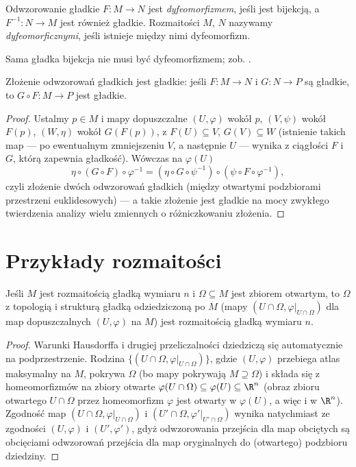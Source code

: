 \begin{definicja}\label{def dyfeo}
Odwzorowanie gładkie $F\colon M\to N$ jest \emph{dyfeomorfizmem}, jeśli jest bijekcją, a
$F^{-1}\colon N\to M$ jest również gładkie. Rozmaitości $M$, $N$ nazywamy
\emph{dyfeomorficznymi}, jeśli istnieje między nimi dyfeomorfizm.
\end{definicja}

Sama gładka bijekcja nie musi być dyfeomorfizmem; zob. .

\begin{stwierdzenie}
Złożenie odwzorowań gładkich jest gładkie: jeśli $F\colon M\to N$ i $G\colon N\to P$ są
gładkie, to $G\circ F\colon M\to P$ jest gładkie.
\end{stwierdzenie}

\begin{proof}
Ustalmy $p\in M$ i mapy dopuszczalne $(U,\varphi)$ wokół $p$, $(V,\psi)$ wokół $F(p)$,
$(W,\eta)$ wokół $G(F(p))$, z $F(U)\subseteq V$, $G(V)\subseteq W$ (istnienie takich map —
po ewentualnym zmniejszeniu $V$, a następnie $U$ — wynika z ciągłości $F$ i $G$, którą zapewnia gładkość).
Wówczas na $\varphi(U)$
\[
\eta\circ(G\circ F)\circ\varphi^{-1}=(\eta\circ G\circ\psi^{-1})\circ(\psi\circ F\circ
\varphi^{-1}),
\]
czyli złożenie dwóch odwzorowań gładkich (między otwartymi podzbiorami przestrzeni
euklidesowych) — a takie złożenie jest gładkie na mocy zwykłego twierdzenia analizy wielu
zmiennych o różniczkowaniu złożenia.
\end{proof}
\section{Przykłady rozmaitości}

\begin{stwierdzenie}\label{stw:otwarty-podzbior}
Jeśli $M$ jest rozmaitością gładką wymiaru $n$ i $\Omega\subseteq M$ jest zbiorem otwartym,
to $\Omega$ z topologią i strukturą gładką odziedziczoną po $M$ (mapy $(U\cap\Omega,
\varphi|_{U\cap\Omega})$ dla map dopuszczalnych $(U,\varphi)$ na $M$) jest rozmaitością
gładką wymiaru $n$.
\end{stwierdzenie}

\begin{proof}
Warunki Hausdorffa i drugiej przeliczalności dziedziczą się automatycznie na
podprzestrzenie. Rodzina $\{(U\cap\Omega,\varphi|_{U\cap\Omega})\}$, gdzie $(U,\varphi)$
przebiega atlas maksymalny na $M$, pokrywa $\Omega$ (bo mapy pokrywają $M\supseteq\Omega$)
i składa się z homeomorfizmów na zbiory otwarte $\varphi(U\cap\Omega)\subseteq\varphi(U)
\subseteq\R^n$ (obraz zbioru otwartego $U\cap\Omega$ przez homeomorfizm $\varphi$ jest
otwarty w $\varphi(U)$, a więc i w $\R^n$). Zgodność map $(U\cap\Omega,\varphi|_{U\cap
\Omega})$ i $(U'\cap\Omega,\varphi'|_{U'\cap\Omega})$ wynika natychmiast ze zgodności
$(U,\varphi)$ i $(U',\varphi')$, gdyż odwzorowania przejścia dla map obciętych są
obcięciami odwzorowań przejścia dla map oryginalnych do (otwartego) podzbioru dziedziny.
\end{proof}

